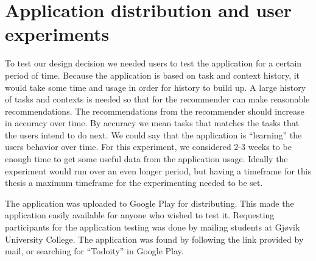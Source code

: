 \section{Application distribution and user experiments}
To test our design decision we needed users to test the application for a certain period of time. Because the application is based on task and context history, it would take some time and usage in order for history to build up. A large history of tasks and contexts is needed so that for the recommender can make reasonable recommendations. The recommendations from the recommender should increase in accuracy over time. By accuracy we mean tasks that matches the tasks that the users intend to do next. We could say that the application is ``learning'' the users behavior over time. For this experiment, we considered 2-3 weeks to be enough time to get some useful data from the application usage. Ideally the experiment would run over an even longer period, but having a timeframe for this thesis a maximum timeframe for the experimenting needed to be set.

The application was uploaded to Google Play for distributing. This made the application easily available for anyone who wished to test it. Requesting participants for the application testing was done by mailing students at Gjøvik University College. The application was found by following the link provided by mail, or searching for ``Todoity'' in Google Play.